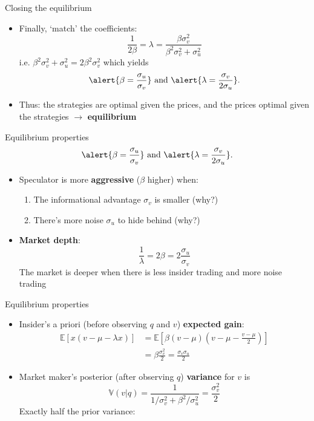 \documentclass[english,10pt
,aspectratio=169
]{beamer}
\begin{document}
\begin{frame}{Closing the equilibrium}
	\begin{itemize}
		\item Finally, `match' the coefficients:
		\[
			\frac{1}{2\beta}=\lambda = \frac{\beta \sigma^2_v}{\beta^2 \sigma^2_v + \sigma^2_u}
		\]
		i.e. $\beta^2 \sigma^2_v + \sigma^2_u = 2 \beta^2 \sigma^2_v$ which yields
		\[
				\alert{ \beta = \frac{\sigma_u}{\sigma_v}}\text{ and } \alert{ \lambda = \frac{\sigma_v}{2\sigma_u}}.
		\]
		\item Thus: the strategies are optimal given the prices, and the prices optimal given the strategies $\rightarrow $ \textbf{equilibrium}
	\end{itemize}
\end{frame}


\begin{frame}{Equilibrium properties}
	\[
		\alert{ \beta = \frac{\sigma_u}{\sigma_v}}\text{ and } \alert{ \lambda = \frac{\sigma_v}{2\sigma_u}}.
	\]
	\begin{itemize}
		\item Speculator is more \textbf{aggressive} ($\beta$ higher) when:
		\begin{enumerate}
			\item The informational advantage $\sigma_v$ is smaller (why?)
			\item There's more noise $\sigma_u$ to hide behind (why?)
		\end{enumerate}
		\item \textbf{Market depth}:
		\[
			\frac{1}{\lambda} = 2\beta = 2 \frac{\sigma_u}{\sigma_v}
		\]
		The market is deeper when there is less insider trading and more noise trading
	\end{itemize}
\end{frame}


\begin{frame}{Equilibrium properties}
	\begin{itemize}
		\item Insider's a priori (before observing $q$ and $v$) \textbf{expected gain}:
		\begin{align*}
		\mathbb{E}[x(v-\mu-\lambda x)] 
		& =\mathbb{E} \left[ \beta(v-\mu)\left(v-\mu-\frac{v-\mu}{2}\right) \right] \\
		&=\beta\frac{ \sigma^2_v}{2}=\frac{\sigma_v \sigma_u}{2}
		\end{align*}
		\item Market maker's posterior (after observing $q$) \textbf{variance} for $v$ is
		\[
		\mathbb{V}(v|q) = \frac{1}{1/\sigma^2_v + \beta^2/\sigma^2_u} = \frac{\sigma^2_v}{2}
		\]
		Exactly half the prior variance: 
	\end{itemize}
\end{frame}
\end{document}
